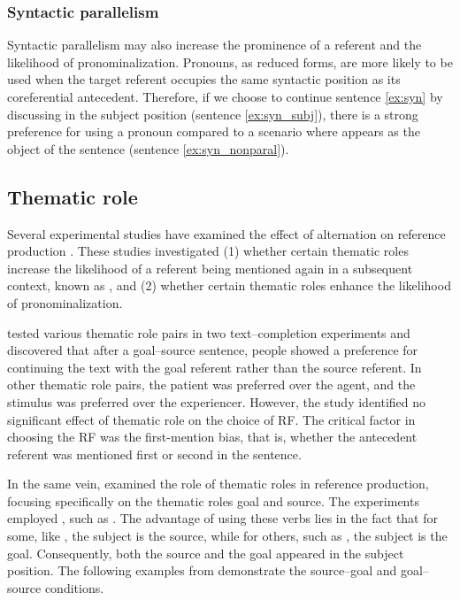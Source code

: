 \subsubsection{Syntactic parallelism} 
Syntactic parallelism may also increase the prominence of a referent and the likelihood of pronominalization. Pronouns, as reduced forms, are more likely to be used when the target referent occupies the same syntactic position as its coreferential antecedent. Therefore, if we choose to continue sentence \ref{ex:syn} by discussing  in the subject position (sentence \ref{ex:syn_subj}), there is a strong preference for using a pronoun compared to a scenario where  appears as the object of the sentence (sentence \ref{ex:syn_nonparal}).

\subsection{Thematic role}\label{subsec:thematicrole}
Several experimental studies have examined the effect of  alternation on reference production \citep{Stevenson1994, Arnold2001, Fukumura2010, rosa2015semantic, vogels2019both}. 
These studies investigated (1) whether certain thematic roles increase the likelihood of a referent being mentioned again in a subsequent context, known as , and (2) whether certain thematic roles enhance the likelihood of pronominalization.


\citet{Stevenson1994} tested various thematic role pairs in two text--com\-ple\-tion experiments and discovered that after a goal--source sentence, people showed a preference for continuing the text with the goal referent rather than the source referent. In other thematic role pairs, the patient was preferred over the agent, and the stimulus was preferred over the experiencer. However, the study identified no significant effect of thematic role on the choice of RF. The critical factor in choosing the RF was the first-mention bias, that is, whether the antecedent referent was mentioned first or second in the sentence.

In the same vein, \citet{Arnold2001} examined the role of thematic roles in reference production, focusing specifically on the thematic roles goal and source.
The experiments employed , such as .
The advantage of using these verbs lies in the fact that for some, like , the subject is the source, while for others, such as , the subject is the goal.
Consequently, both the source and the goal appeared in the subject position. The following examples from \citet{Arnold2001} demonstrate the source--goal and goal--source conditions.


